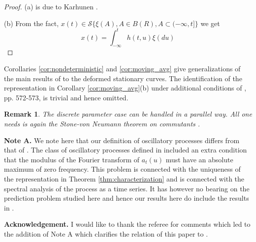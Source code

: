\documentclass{article}
\newtheorem{remark}{Remark}
\begin{document}
\begin{proof}
(a) is due to Karhunen \cite{Karhunen}.

(b) From the fact, $x(t) \in \mathcal{S}\{\xi(A), A \in B(R), A \subset(-\infty, t]\}$ we get
\begin{equation}
x(t)=\int_{-\infty}^{t} h(t, u) \xi(du) \label{eq:x_moving_avg}
\end{equation}
\end{proof}

Corollaries \ref{cor:nondeterministic} and \ref{cor:moving_avg} give generalizations of the main results of \cite{Abdrabbo} to the deformed stationary curves. The identification of the representation in Corollary \ref{cor:moving_avg}(b) under additional conditions of \cite{Abdrabbo}, pp. 572-573, is trivial and hence omitted.

\begin{remark}\label{rem:discrete}
The discrete parameter case can be handled in a parallel way. All one needs is again the Stone-von Neumann theorem on commutants \cite{Masani}.
\end{remark}

\textbf{Note A.} We note here that our definition of oscillatory processes differs from that of \cite{Priestley}. The class of oscillatory processes defined in \cite{Priestley} included an extra condition that the modulus of the Fourier transform of $a_{t}(u)$ must have an absolute maximum of zero frequency. This problem is connected with the uniqueness of the representation in Theorem \ref{thm:characterization} and is connected with the spectral analysis of the process as a time series. It has however no bearing on the prediction problem studied here and hence our results here do include the results in \cite{Abdrabbo}.

\textbf{Acknowledgement.} I would like to thank the referee for comments which led to the addition of Note A which clarifies the relation of this paper to \cite{Priestley}.
\end{document}
